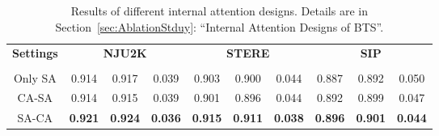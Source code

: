 \documentclass{article}
\begin{document}
\begin{table}[t]
	\centering
	\caption{Results of different internal attention designs. Details are in Section~\ref{sec:AblationStduy}: ``Internal Attention Designs of BTS''.}
 	\vspace{-0.2cm}
	\label{table:AS2}
	\vspace{8pt}
	\footnotesize
\renewcommand{\tabcolsep}{0.8mm}
	\begin{tabular}{c|ccc|ccc|ccc}
		\hline\toprule
\multirow{2}{*}{\textbf{Settings}} &\multicolumn{3}{c|}{\textbf{NJU2K}}  &\multicolumn{3}{c|}{\textbf{STERE}}
		&\multicolumn{3}{c}{\textbf{SIP}} \\
		&
		& 
		& 
	    &
	    & 
		& 
		&
		& 
		& 

		






\\
		\midrule


Only SA  &0.914	&0.917	&0.039	&0.903	&0.900	&0.044	&0.887	&0.892	&0.050

  \\
		 CA-SA   &0.914	&0.915	&0.039	&0.901	&0.896	&0.044		&0.892	&0.899	&0.047

  \\
		SA-CA  &\bf{0.921}	&\bf{0.924}	&\bf{0.036} &\bf{0.915}	&\bf{0.911}	&\bf{0.038}	&\bf{0.896}	&\bf{0.901}	&\bf{0.044}
  \\
		\bottomrule
		\hline
	\end{tabular}
	\vspace{-8pt}
\end{table}
\end{document}
